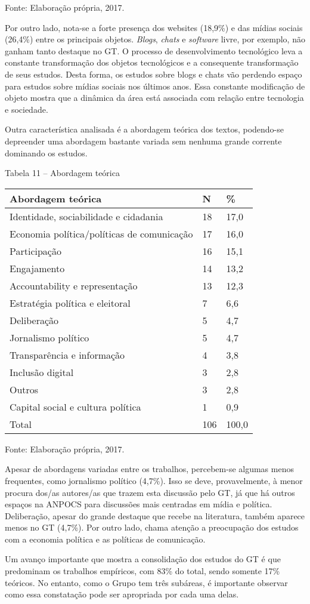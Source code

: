 Fonte: Elaboração própria, 2017.

Por outro lado, nota-se a forte presença dos websites (18,9\%) e das
mídias sociais (26,4\%) entre os principais objetos. \emph{Blogs},
\emph{chats} e \emph{software} livre, por exemplo, não ganham tanto
destaque no GT. O processo de desenvolvimento tecnológico leva a
constante transformação dos objetos tecnológicos e a consequente
transformação de seus estudos. Desta forma, os estudos sobre blogs e
chats vão perdendo espaço para estudos sobre mídias sociais nos últimos
anos. Essa constante modificação de objeto mostra que a dinâmica da área
está associada com relação entre tecnologia e sociedade.

Outra característica analisada é a abordagem teórica dos textos,
podendo-se depreender uma abordagem bastante variada sem nenhuma grande
corrente dominando os estudos.

Tabela 11 -- Abordagem teórica

\begin{longtable}[]{@{}lll@{}}
\toprule
Abordagem teórica & N & \%\tabularnewline
\midrule
\endhead
Identidade, sociabilidade e cidadania & 18 & 17,0\tabularnewline
Economia política/políticas de comunicação & 17 & 16,0\tabularnewline
Participação & 16 & 15,1\tabularnewline
Engajamento & 14 & 13,2\tabularnewline
Accountability e representação & 13 & 12,3\tabularnewline
Estratégia política e eleitoral & 7 & 6,6\tabularnewline
Deliberação & 5 & 4,7\tabularnewline
Jornalismo político & 5 & 4,7\tabularnewline
Transparência e informação & 4 & 3,8\tabularnewline
Inclusão digital & 3 & 2,8\tabularnewline
Outros & 3 & 2,8\tabularnewline
Capital social e cultura política & 1 & 0,9\tabularnewline
Total & 106 & 100,0\tabularnewline
\bottomrule
\end{longtable}

Fonte: Elaboração própria, 2017.

Apesar de abordagens variadas entre os trabalhos, percebem-se algumas
menos frequentes, como jornalismo político (4,7\%). Isso se deve,
provavelmente, à menor procura dos/as autores/as que trazem esta
discussão pelo GT, já que há outros espaços na ANPOCS para discussões
mais centradas em mídia e política. Deliberação, apesar do grande
destaque que recebe na literatura, também aparece menos no GT (4,7\%).
Por outro lado, chama atenção a preocupação dos estudos com a economia
política e as políticas de comunicação.

Um avanço importante que mostra a consolidação dos estudos do GT é que
predominam os trabalhos empíricos, com 83\% do total, sendo somente 17\%
teóricos. No entanto, como o Grupo tem três subáreas, é importante
observar como essa constatação pode ser apropriada por cada uma delas.

